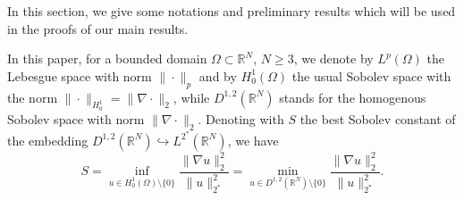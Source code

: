 \documentclass[10pt]{article}
\newcommand{\R}{\mathbb{R}}
\theoremstyle{definition}
\numberwithin{equation}{section}
\begin{document}
In this section, we give some notations and preliminary results which will be used in the proofs of our main results. 

In this paper, for a bounded domain $\Omega\subset \R^N$, $N\ge3$, 
we denote by $L^{p}(\Omega)$ the Lebesgue space with norm $\|\cdot\|_{p}$ and by
$H^{1}_{0}(\Omega)$ the usual Sobolev space with the norm $\|\cdot\|_{H^{1}_{0}}=\|\nabla \cdot\|_{2}$, while $D^{1,2}(\R^N)$ stands for the homogenous Sobolev space with norm
$\|\nabla \cdot\|_{2}$. Denoting with $S$ the best Sobolev constant of the embedding $D^{1,2}(\R^N)
\hookrightarrow L^{2^{*}}(\R^N)$, we have
%
\begin{equation}\label{ineq:sobolev}
S=\inf\limits_{u\in H^{1}_{0}(\Omega)\setminus \{0\}}\frac{\|\nabla u\|_2^{2}}{\|u\|_{2^{*}}^2}=\min\limits_{u\in D^{1,2}(\R^N)\setminus \{0\}}\frac{\|\nabla u\|_{2}^{2}}{\|u\|_{2^{*}}^2}.
\end{equation}
\end{document}
